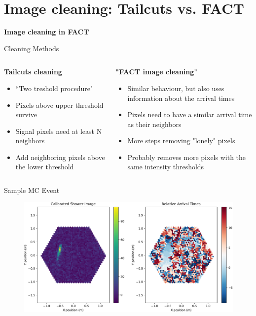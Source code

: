 \section{Image cleaning: Tailcuts vs. FACT}

\begin{frame}
    \centering
    {\Huge \textbf{Image cleaning in FACT}}
\end{frame}

\begin{frame}{Cleaning Methods}
    \begin{columns}[T] %
        \begin{column}{.48\textwidth}
            \textbf{Tailcuts cleaning}
            \vspace{8pt}
            \begin{itemize}
                \item ``Two treshold procedure"
                \item Pixels above upper threshold survive
                \item Signal pixels need at least N neighbors
                \item Add neighboring pixels above the lower threshold
            \end{itemize}
        \end{column}
        \begin{column}{.48\textwidth}
            \textbf{"FACT image cleaning"}
            \vspace{8pt}
            \begin{itemize}
                \item Similar behaviour, but also uses information about the arrival times
                \item Pixels need to have a similar arrival time as their neighbors
                \item More steps removing "lonely" pixels
                \item[\rightarrow] Probably removes more pixels with the same intensity thresholds
            \end{itemize}
        \end{column}
    \end{columns}
\end{frame}

\begin{frame}{Sample MC Event}
    \begin{figure}
        \includegraphics[width=0.85\linewidth]{images/cleaning_plots/raw-crop.pdf}
    \end{figure}
\end{frame}



